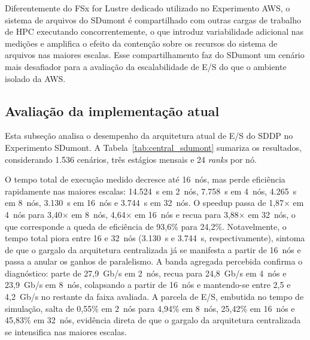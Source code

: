 Diferentemente do FSx for Lustre dedicado utilizado no Experimento AWS, o
sistema de arquivos do SDumont é compartilhado com outras cargas de
trabalho de HPC executando concorrentemente, o que introduz variabilidade
adicional nas medições e amplifica o efeito da contenção sobre os
recursos do sistema de arquivos nas maiores escalas. Esse compartilhamento
faz do SDumont um cenário mais desafiador para a avaliação da
escalabilidade de E/S do que o ambiente isolado da AWS.


\subsection{Avaliação da implementação atual}
\label{sec:sdumont_atual}
Esta subseção analisa o desempenho da arquitetura atual de E/S do SDDP
no Experimento SDumont. A Tabela~\ref{tab:central_sdumont} sumariza os
resultados, considerando 1.536 cenários, três estágios mensais e 24
\textit{ranks} por nó.

O tempo total de execução medido decresce até 16~nós, mas perde
eficiência rapidamente nas maiores escalas: 14.524~s em 2~nós,
7.758~s em 4~nós, 4.265~s em 8~nós, 3.130~s em 16~nós e
3.744~s em 32~nós. O speedup passa de 1{,}87$\times$ em 4~nós
para 3{,}40$\times$ em 8~nós, 4{,}64$\times$ em 16~nós e recua
para 3{,}88$\times$ em 32~nós, o que corresponde a queda de
eficiência de 93{,}6\% para 24{,}2\%. Notavelmente, o tempo total
piora entre 16 e 32~nós (3.130~s e 3.744~s, respectivamente),
sintoma de que o gargalo da arquitetura centralizada já se manifesta
a partir de 16~nós e passa a anular os ganhos de paralelismo. A banda
agregada percebida confirma o diagnóstico: parte de 27{,}9~Gb/s em
2~nós, recua para 24{,}8~Gb/s em 4~nós e 23{,}9~Gb/s em 8~nós,
colapsando a partir de 16~nós e mantendo-se entre 2{,}5 e 4{,}2~Gb/s no restante da faixa
avaliada. A parcela de E/S, embutida no tempo de simulação, salta de
0{,}55\% em 2~nós para 4{,}94\% em 8~nós, 25{,}42\% em 16~nós e
45{,}83\% em 32~nós, evidência direta de que o gargalo da arquitetura
centralizada se intensifica nas maiores escalas.

